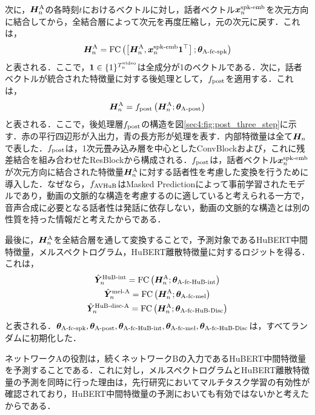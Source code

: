 次に，$\bm{H}^{\text{A}}_{n}$の各時刻$t$におけるベクトルに対し，話者ベクトル$\bm{x}^{\text{spk-emb}}_{n}$を次元方向に結合してから，全結合層によって次元を再度圧縮し，元の次元に戻す．これは，
\begin{equation}
    \bm{H}^{\text{A}}_{n} = \text{FC}\left(\left[\bm{H}^{\text{A}}_{n}, \bm{x}^{\text{spk-emb}}_{n} \bm{1}^{\top}\right]; \bm{\theta}_{\text{A-fc-spk}}\right)
\end{equation}
と表される．ここで，$\bm{1} \in \{1\}^{T^{\text{video}}_{n}}$は全成分が1のベクトルである．次に，話者ベクトルが統合された特徴量に対する後処理として，$f_{\text{post}}$を適用する．これは，
\begin{equation}
    \bm{H}^{\text{A}}_{n} = f_{\text{post}}\left(\bm{H}^{\text{A}}_{n}; \bm{\theta}_{\text{A-post}}\right)
\end{equation}
と表される．ここで，後処理層$f_{\text{post}}$の構造を図\ref{sec4:fig:post_three_step}に示す．赤の平行四辺形が入出力，青の長方形が処理を表す．内部特徴量は全て$\bm{H}_{n}$で表した．$f_{\text{post}}$は，1次元畳み込み層を中心としたConvBlockおよび，これに残差結合を組み合わせたResBlockから構成される．$f_{\text{post}}$は，話者ベクトル$\bm{x}^{\text{spk-emb}}_{n}$が次元方向に結合された特徴量$\bm{H}^{\text{A}}_{n}$に対する話者性を考慮した変換を行うために導入した．なぜなら，$f_{\text{AVHuB}}$はMasked Predictionによって事前学習されたモデルであり，動画の文脈的な構造を考慮するのに適していると考えられる一方で，音声合成に必要となる話者性は発話に依存しない，動画の文脈的な構造とは別の性質を持った情報だと考えたからである．

最後に，$\bm{H}^{\text{A}}_{n}$を全結合層を通して変換することで，予測対象であるHuBERT中間特徴量，メルスペクトログラム，HuBERT離散特徴量に対するロジットを得る．これは，
\begin{gather}
    \hat{\bm{Y}}^{\text{HuB-int}}_{n} = \text{FC}\left(\bm{H}^{\text{A}}_{n}; \bm{\theta}_{\text{A-fc-HuB-int}}\right) \\
    \hat{\bm{Y}}^{\text{mel-A}}_{n} = \text{FC}\left(\bm{H}^{\text{A}}_{n}; \bm{\theta}_{\text{A-fc-mel}}\right) \\
    \hat{\bm{Y}}^{\text{HuB-disc-A}}_{n} = \text{FC}\left(\bm{H}^{\text{A}}_{n}; \bm{\theta}_{\text{A-fc-HuB-Disc}}\right)
\end{gather}
と表される．$\bm{\theta}_{\text{A-fc-spk}}, \bm{\theta}_{\text{A-post}}, \bm{\theta}_{\text{A-fc-HuB-int}}, \bm{\theta}_{\text{A-fc-mel}}, \bm{\theta}_{\text{A-fc-HuB-Disc}}$は，すべてランダムに初期化した．

ネットワークAの役割は，続くネットワークBの入力であるHuBERT中間特徴量を予測することである．これに対し，メルスペクトログラムとHuBERT離散特徴量の予測を同時に行った理由は，先行研究においてマルチタスク学習の有効性が確認されており，HuBERT中間特徴量の予測においても有効ではないかと考えたからである．

